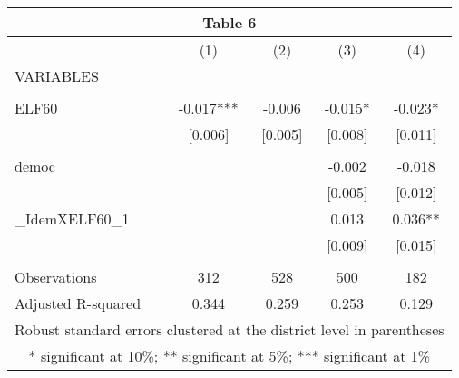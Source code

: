 \begin{tabular}{lcccc}
\multicolumn{5}{c}{Table 6} \\ \hline
 & (1) & (2) & (3) & (4) \\
VARIABLES &  &  &  &  \\ \hline
 &  &  &  &  \\
ELF60 & -0.017*** & -0.006 & -0.015* & -0.023* \\
 & [0.006] & [0.005] & [0.008] & [0.011] \\
 &  &  &  &  \\
democ &  &  & -0.002 & -0.018 \\
 &  &  & [0.005] & [0.012] \\
\_IdemXELF60\_1 &  &  & 0.013 & 0.036** \\
 &  &  & [0.009] & [0.015] \\
 &  &  &  &  \\
Observations & 312 & 528 & 500 & 182 \\
 Adjusted R-squared & 0.344 & 0.259 & 0.253 & 0.129 \\ \hline
\multicolumn{5}{c}{ Robust standard errors clustered at the district level in parentheses} \\
\multicolumn{5}{c}{ * significant at 10\%; ** significant at 5\%; *** significant at 1\%} \\
\end{tabular}
